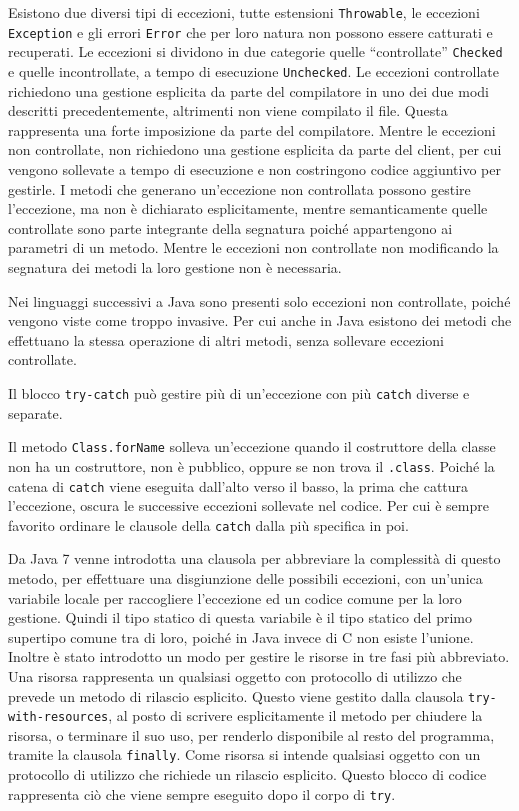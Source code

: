 \documentclass{article}
\numberwithin{equation}{subsection}
\begin{document}
Esistono due diversi tipi di eccezioni, tutte estensioni \verb|Throwable|, le eccezioni \verb|Exception| e gli errori \verb|Error| che per loro natura non possono essere 
catturati e recuperati. 
Le eccezioni si dividono in due categorie quelle ``controllate'' \verb|Checked| e quelle incontrollate, a tempo di esecuzione \verb|Unchecked|. Le eccezioni controllate richiedono 
una gestione esplicita da parte del compilatore in uno dei due modi descritti precedentemente, altrimenti non viene compilato il file. 
Questa rappresenta una forte imposizione da parte del compilatore. 
Mentre le eccezioni non controllate, 
non richiedono una gestione esplicita da parte del client, per cui vengono sollevate a tempo di esecuzione e non costringono codice aggiuntivo per gestirle. 
I metodi che generano un'eccezione non controllata possono gestire l'eccezione, ma non è dichiarato esplicitamente, mentre semanticamente quelle controllate sono parte 
integrante della segnatura poiché appartengono ai parametri di un metodo. Mentre le eccezioni non controllate non modificando la segnatura dei metodi la loro 
gestione non è necessaria. 

Nei linguaggi successivi a Java sono presenti solo eccezioni non controllate, poiché vengono viste come troppo invasive. Per cui anche in Java esistono dei metodi che 
effettuano la stessa operazione di altri metodi, senza sollevare eccezioni controllate. 

Il blocco \verb|try-catch| può gestire più di un'eccezione con più \verb|catch| diverse e separate. 

Il metodo \verb|Class.forName| solleva un'eccezione quando il costruttore della classe non ha un costruttore, non è pubblico, oppure se non trova il \verb|.class|. 
Poiché la catena di \verb|catch| viene eseguita dall'alto verso il basso, la prima che cattura l'eccezione, oscura le successive eccezioni sollevate nel codice. 
Per cui è sempre favorito ordinare le clausole della \verb|catch| dalla più specifica in poi. 

Da Java 7 venne introdotta una clausola per abbreviare la complessità di questo  
metodo, per effettuare una disgiunzione delle possibili eccezioni, con un'unica variabile locale per raccogliere l'eccezione ed un codice comune per la loro gestione. 
Quindi il tipo statico di questa variabile è il tipo statico del primo supertipo comune tra di loro, poiché in Java invece di C non esiste l'unione. 
Inoltre è stato introdotto un modo per gestire le risorse in tre fasi più abbreviato. Una risorsa rappresenta un qualsiasi oggetto con protocollo di utilizzo che prevede 
un metodo di rilascio esplicito. Questo viene gestito dalla clausola \verb|try-with-resources|, al posto di scrivere esplicitamente il metodo per chiudere la risorsa, o 
terminare il suo uso, per renderlo disponibile al resto del programma, tramite la clausola \verb|finally|. 
Come risorsa si intende qualsiasi oggetto con un protocollo di utilizzo che richiede un rilascio esplicito. 
Questo blocco di codice rappresenta ciò che viene sempre eseguito dopo il corpo di \verb|try|. 
\end{document}
